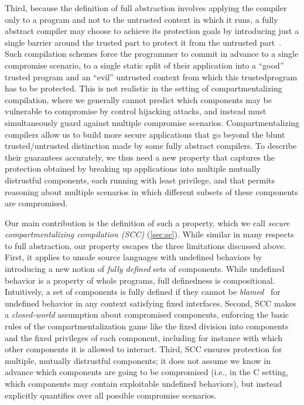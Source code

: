 \documentclass[10pt, conference, compsocconf, letterpaper, times]{IEEEtran}
\begin{document}
Third, because the definition of full abstraction involves applying the
compiler only to a program and not to the untrusted context in which it
runs, a fully abstract compiler may choose to achieve its protection goals
by introducing just a single barrier around the trusted part to protect it
from the untrusted part~\cite{PatrignaniASJCP15, AgtenSJP12, LarmuseauPC15,
  PatrignaniCP13, patrignani_thesis}.
Such compilation schemes force the programmer to commit in advance to a
single compromise scenario, \IE to a single static split of their
application into a ``good'' trusted program and an ``evil'' untrusted
context from which this \iffull trusted\fi program has to be protected.
This is not realistic in the setting of compartmentalizing compilation,
where we generally cannot predict which components may be vulnerable to
compromise by control hijacking attacks, and instead must simultaneously
guard against multiple compromise scenarios.
Compartmentalizing compilers allow us to build more secure applications
that go beyond the blunt trusted/untrusted distinction made by some fully
abstract compilers.
To describe their guarantees accurately, we thus need a new property that
captures the protection obtained by breaking up applications into multiple
mutually distrustful components, each running with least privilege, and that
permits reasoning about multiple scenarios in which different subsets of
these components are compromised.


Our main contribution is the definition of such a property,
which we call {\em secure compartmentalizing compilation (SCC)}
(\autoref{sec:sc}).
While similar in many respects to full abstraction, our property
escapes the three limitations discussed above.
First, it
applies to unsafe source languages with
undefined behaviors by introducing a new notion of {\em fully defined}
sets of components.
While undefined behavior is a property of whole programs, full definedness
is compositional.
Intuitively, a set of components is fully defined if they cannot be
{\em blamed}~\cite{FindlerF02prime} for undefined behavior
in any context satisfying fixed interfaces.
Second, SCC makes a {\em closed-world} assumption about compromised
components, enforcing the basic rules of the compartmentalization game
like the fixed division into components and the fixed privileges of
each component, including for instance with which other components it
is allowed to interact.
Third, SCC ensures protection for
multiple, mutually distrustful components; it does not assume we know in
advance which components are going to be compromised (i.e., in the C
setting, which components may contain exploitable undefined behaviors), but
instead explicitly quantifies over all possible compromise scenarios.
\end{document}
